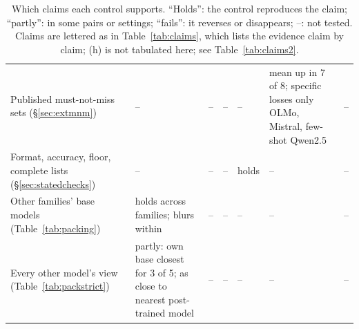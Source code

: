 \documentclass[wcp]{jmlr}
\begin{document}
\begin{table}[p]
\begin{tabular}{L{2.2cm}L{1.7cm}L{2.0cm}L{1.8cm}L{2.0cm}L{2.3cm}L{1.9cm}}
Published must-not-miss sets (\S\ref{sec:extmnm}) & -- & -- & -- & -- & mean up in 7 of 8; specific losses only OLMo, Mistral, few-shot Qwen2.5 & -- \\
Format, accuracy, floor, complete lists (\S\ref{sec:statedchecks}) & -- & -- & -- & holds & -- & -- \\
Other families' base models (Table~\ref{tab:packing}) & holds across families; blurs within & -- & -- & -- & -- & -- \\
Every other model's view (Table~\ref{tab:packstrict}) & partly: own base closest for 3 of 5; as close to nearest post-trained model & -- & -- & -- & -- & -- \\
\bottomrule
\end{tabular}
\caption{Which claims each control supports. ``Holds'': the control reproduces the claim; ``partly'': in some pairs or settings; ``fails'': it reverses or disappears; --: not tested. Claims are lettered as in Table~\ref{tab:claims}, which lists the evidence claim by claim; (h) is not tabulated here; see Table~\ref{tab:claims2}.}
\label{tab:controlmatrix}
\end{table}
\end{document}
